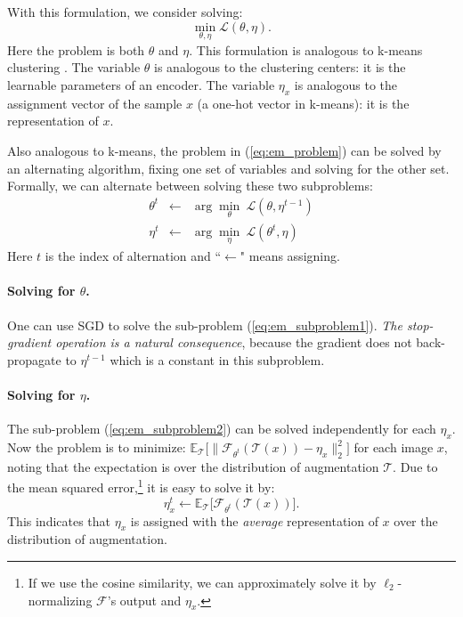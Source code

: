 \documentclass[final]{cvpr}
\begin{document}
With this formulation, we consider solving:
\begin{equation}
\min_{\theta, \eta} \mathcal{L}(\theta, \eta).
\label{eq:em_problem}
\end{equation}
Here the problem is \wrt both $\theta$ and $\eta$.
This formulation is analogous to k-means clustering \cite{MacQueen1967}. The variable $\theta$ is analogous to the clustering centers: it is the learnable parameters of an encoder. The variable $\eta_x$ is analogous to the assignment vector of the sample $x$ (a one-hot vector in k-means): it is the representation of $x$. 

Also analogous to k-means, the problem in (\ref{eq:em_problem}) can be solved by an alternating algorithm, fixing one set of variables and solving for the other set. Formally, we can alternate between solving these two subproblems:
\begin{eqnarray}
\theta^t &\leftarrow & \arg\min_{\theta}~\mathcal{L}(\theta, \eta^{t{-}1})
\label{eq:em_subproblem1}
\\
\eta^t &\leftarrow& \arg\min_{\eta}~\mathcal{L}(\theta^t, \eta)
\label{eq:em_subproblem2}
\end{eqnarray}
Here $t$ is the index of alternation and ``$\leftarrow$" means assigning.

\paragraph{Solving for $\theta$.} One can use SGD to solve the sub-problem (\ref{eq:em_subproblem1}).
\emph{The stop-gradient operation is a natural consequence}, because the gradient does not back-propagate to $\eta^{t-1}$ which is a constant in this subproblem.

\paragraph{Solving for $\eta$.} The sub-problem (\ref{eq:em_subproblem2}) can be solved independently for each $\eta_x$. Now the problem is to minimize:
$
\mathbb{E}_{\mathcal{T}}
\Big[
	\|
	\mathcal{F}_{\theta^t}(\mathcal{T}(x)) - \eta_{x} 
	\|^2_2
\Big]
$
for each image $x$, noting that the expectation is over the distribution of augmentation $\mathcal{T}$.
Due to the mean squared error,\footnote{If we use the cosine similarity, we can approximately 
solve it by $\ell_2$-normalizing $\mathcal{F}$'s output and $\eta_x$.} it is easy to solve it by:
\begin{equation}
\eta^t_x \leftarrow
\mathbb{E}_{\mathcal{T}}
\Big[
	\mathcal{F}_{\theta^t}(\mathcal{T}(x))
\Big].
\label{eq:eta0}
\end{equation}
This indicates that $\eta_x$ is assigned with the \emph{average} representation of $x$ over the distribution of augmentation.
\end{document}

